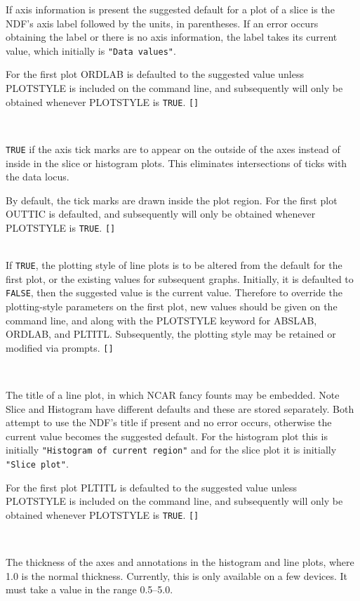 \documentclass[twoside,11pt]{article}
\newcommand{\sstsubsection}[1]{ \item[{#1}] \mbox{} \\}
\newcommand{\sstsubsection}[1]{\item[{#1}]}
\begin{document}
{{{         If axis information is present the suggested default for a
         plot of a slice is the NDF's axis label followed by the
         units, in parentheses.  If an error occurs obtaining the label
         or there is no axis information, the label takes its current
         value, which initially is {\tt "Data values"}.

         For the first plot ORDLAB is defaulted to the suggested value
         unless PLOTSTYLE is included on the command line, and
         subsequently will only be obtained whenever PLOTSTYLE is {\tt TRUE}.
         {\tt []}
      }
      \sstsubsection{
         OUTTIC = \_LOGICAL (Read)
      }{
         {\tt TRUE} if the axis tick marks are to appear on the outside of
         the axes instead of inside in the slice or histogram plots.
         This eliminates intersections of ticks with the data locus.

         By default, the tick marks are drawn inside the plot region.
         For the first plot OUTTIC is defaulted, and subsequently will
         only be obtained whenever PLOTSTYLE is {\tt TRUE}.  {\tt []}
      }
      \sstsubsection{
         PLOTSTYLE = \_LOGICAL (Read)
      }{
         If {\tt TRUE}, the plotting style of line plots is to be altered from
         the default for the first plot, or the existing values for
         subsequent graphs.  Initially, it is defaulted to {\tt FALSE}, then
         the suggested value is the current value.  Therefore to
         override the plotting-style parameters on the first plot, new
         values should be given on the command line, and along with the
         PLOTSTYLE keyword for ABSLAB, ORDLAB, and PLTITL.
         Subsequently, the plotting style may be
         retained or modified via prompts.  {\tt []}
      }
      \sstsubsection{
         PLTITL = LITERAL (Read)
      }{
         The title of a line plot, in which NCAR fancy founts may be
         embedded.  Note Slice and Histogram have different defaults
         and these are stored separately.  Both attempt to use the NDF's
         title if present and no error occurs, otherwise the current
         value becomes the suggested default.  For the histogram plot
         this is initially {\tt "Histogram of current region"} and for the
         slice plot it is initially {\tt "Slice plot"}.

         For the first plot PLTITL is defaulted to the suggested value
         unless PLOTSTYLE is included on the command line, and
         subsequently will only be obtained whenever PLOTSTYLE is {\tt TRUE}.
         {\tt []}
      }
      \sstsubsection{
         THICK = \_REAL (Read)
      }{
         The thickness of the axes and annotations in the histogram and
         line plots, where 1.0 is the normal thickness.  Currently,
         this is only available on a few devices.  It must take a value
         in the range 0.5--5.0.

}}}
\end{document}
